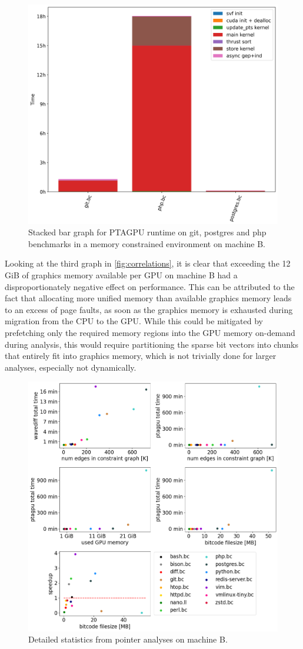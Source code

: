 \begin{figure}
    \centering
    \includegraphics[width=.6\textwidth]{img/stackedbar-problems.png}
    \caption[Stacked bar graph for PTAGPU runtime on git, postgres and php benchmarks.]{Stacked bar graph for PTAGPU runtime on git, postgres and php benchmarks in a memory constrained environment on machine B.}
    \label{fig:stackedbar-problem}
\end{figure}
Looking at the third graph in \autoref{fig:correlations}, it is clear that exceeding the 12 GiB of graphics memory available per GPU on machine B had a disproportionately negative effect on performance.
This can be attributed to the fact that allocating more unified memory than available graphics memory leads to an excess of page faults, as soon as the graphics memory is exhausted during migration from the CPU to the GPU. 
While this could be mitigated by prefetching only the required memory regions into the GPU memory on-demand during analysis, this would require partitioning the sparse bit vectors into chunks that entirely fit into graphics memory, which is not trivially done for larger analyses, especially not dynamically.
\begin{figure}
    \centering
    \includegraphics[width=.9\textwidth]{img/correlations.png}
    \caption[Detailed statistics from machine B]{Detailed statistics from pointer analyses on machine B.}
    \label{fig:correlations}
\end{figure}
